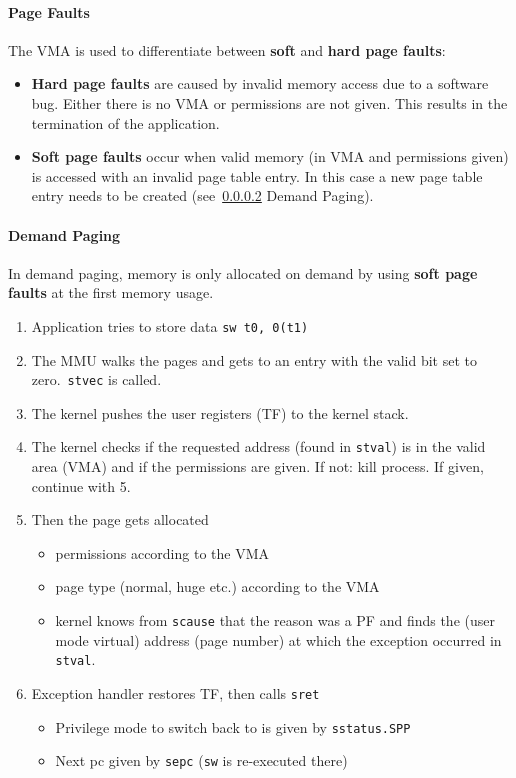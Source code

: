 \paragraph{Page Faults}
The VMA is used to differentiate between \textbf{soft} and \textbf{hard page faults}:
\begin{itemize}
    \item \textbf{Hard page faults} are caused by invalid memory access due to a software bug. Either there is no VMA or permissions are not given. This results in the termination of the application.
    \item \textbf{Soft page faults} occur when valid memory (in VMA and permissions given) is accessed with an invalid page table entry. In this case a new page table entry needs to be created (see~\ref{page demanding} Demand Paging).
\end{itemize}



\paragraph{Demand Paging}\label{page demanding}
In demand paging, memory is only allocated on demand by using \textbf{soft page faults} at the first memory usage.

\newpar{}

\begin{enumerate}
    \item Application tries to store data
          \texttt{sw t0, 0(t1)}
    \item The MMU walks the pages and gets to an entry with the valid bit set to zero.~\texttt{stvec} is called.
    \item The kernel pushes the user registers (TF) to the kernel stack.
    \item The kernel checks if the requested address (found in \texttt{stval}) is in the valid area (VMA) and if the permissions are given. If not: kill process. If given, continue with 5.
    \item Then the page gets allocated
          \begin{itemize}
              \item permissions according to the VMA
              \item page type (normal, huge etc.) according to the VMA
              \item kernel knows from \texttt{scause} that the reason was a PF and finds the (user mode virtual) address (page number) at which the exception occurred in \texttt{stval}.
          \end{itemize}
    \item Exception handler restores TF, then calls \texttt{sret}
          \begin{itemize}
              \item Privilege mode to switch back to is given by \texttt{sstatus.SPP}
              \item Next pc given by \texttt{sepc} (\texttt{sw} is re-executed there)
          \end{itemize}
\end{enumerate}


